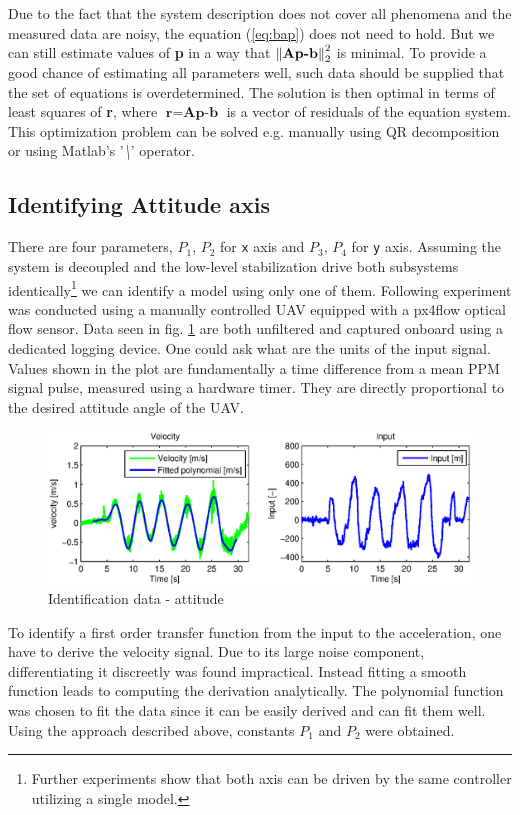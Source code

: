 Due to the fact that the system description does not cover all phenomena and the measured data are noisy, the equation (\ref{eq:bap}) does not need to hold. But we can still estimate values of \textbf{p} in a way that $\left\lVert\textbf{Ap-b}\right\rVert_2^2$ is minimal. To provide a good chance of estimating all parameters well, such data should be supplied that the set of equations is overdetermined. The solution is then optimal in terms of least squares of \textbf{r}, where $\textbf{r} = \textbf{Ap-b}$ is a vector of residuals of the equation system. This optimization problem can be solved e.g. manually using QR decomposition or using Matlab's '\textit{\textbackslash}' operator.

\subsection{Identifying Attitude axis}

There are four parameters, $P_1$, $P_2$ for \texttt{x} axis and $P_3$, $P_4$ for \texttt{y} axis. Assuming the system is decoupled and the low-level stabilization drive both subsystems identically\footnote{Further experiments show that both axis can be driven by the same controller utilizing a single model.} we can identify a model using only one of them. Following experiment was conducted using a manually controlled UAV equipped with a px4flow optical flow sensor. Data seen in fig. \ref{fig:iden1} are both unfiltered and captured onboard using a dedicated logging device. One could ask what are the units of the input signal. Values shown in the plot are fundamentally a time difference from a mean PPM signal pulse, measured using a hardware timer. They are directly proportional to the desired attitude angle of the UAV.

\begin{figure}[h!]
\includegraphics[width=1\textwidth]{fig/iden1.eps} 
\caption{Identification data - attitude}
\label{fig:iden1}
\end{figure}

To identify a first order transfer function from the input to the acceleration, one have to derive the velocity signal. Due to its large noise component, differentiating it discreetly was found impractical. Instead fitting a smooth function leads to computing the derivation analytically. The polynomial function was chosen to fit the data since it can be easily derived and can fit them well. Using the approach described above, constants $P_1$ and $P_2$ were obtained.

